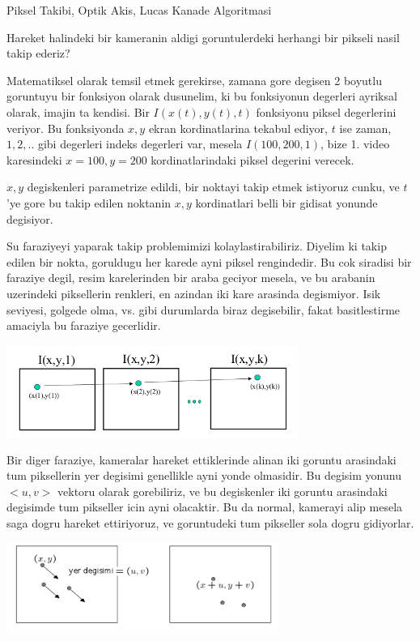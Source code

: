 \documentclass[12pt,fleqn]{article}
\begin{document}
Piksel Takibi, Optik Akis, Lucas Kanade Algoritmasi

Hareket halindeki bir kameranin aldigi goruntulerdeki herhangi bir pikseli
nasil takip ederiz? 

Matematiksel olarak temsil etmek gerekirse, zamana gore degisen 2 boyutlu
goruntuyu bir fonksiyon olarak dusunelim, ki bu fonksiyonun degerleri
ayriksal olarak, imajin ta kendisi. Bir $I(x(t),y(t),t)$ fonksiyonu piksel
degerlerini veriyor. Bu fonksiyonda $x,y$ ekran kordinatlarina tekabul
ediyor, $t$ ise zaman, $1,2,..$ gibi degerleri indeks degerleri var, mesela
$I(100,200,1)$, bize 1. video karesindeki $x=100,y=200$ kordinatlarindaki
piksel degerini verecek.

$x,y$ degiskenleri parametrize edildi, bir noktayi takip etmek istiyoruz
cunku, ve $t$'ye gore bu takip edilen noktanin $x,y$ kordinatlari belli bir
gidisat yonunde degisiyor.

Su faraziyeyi yaparak takip problemimizi kolaylastirabiliriz. Diyelim ki
takip edilen bir nokta, goruldugu her karede ayni piksel rengindedir. Bu
cok siradisi bir faraziye degil, resim karelerinden bir araba geciyor
mesela, ve bu arabanin uzerindeki piksellerin renkleri, en azindan iki kare
arasinda degismiyor. Isik seviyesi, golgede olma, vs. gibi durumlarda biraz
degisebilir, fakat basitlestirme amaciyla bu faraziye gecerlidir. 

\includegraphics[height=3cm]{disp2.png}

Bir diger faraziye, kameralar hareket ettiklerinde alinan iki goruntu
arasindaki tum piksellerin yer degisimi genellikle ayni yonde olmasidir. Bu
degisim yonunu $<u,v>$ vektoru olarak gorebiliriz, ve bu degiskenler iki
goruntu arasindaki degisimde tum pikseller icin ayni olacaktir. Bu da
normal, kamerayi alip mesela saga dogru hareket ettiriyoruz, ve goruntudeki
tum pikseller sola dogru gidiyorlar.

\includegraphics[height=3cm]{disp.png}
\end{document}
